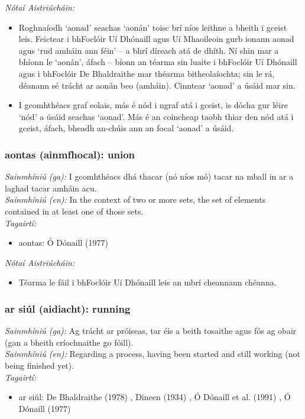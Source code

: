 \documentclass{article}
\begin{document}
 \noindent \textit{Nótaí Aistriúcháin:}
\begin{itemize}
	\item Roghnaíodh `aonad' seachas `aonán' toisc brí níos leithne a bheith i gceist leis. Feictear i bhFoclóir Uí Dhónaill agus Uí Mhaoileoin gurb ionann aonad agus `rud amháin ann féin' -- a bhrí díreach atá de dhíth. Ní shin mar a bhíonn le `aonán', áfach -- bíonn an téarma sin luaite i bhFoclóir Uí Dhónaill agus i bhFoclóir De Bhaldraithe mar théarma bitheolaíochta; sin le rá, déanann sé trácht ar aonán beo (amháin). Cinntear `aonad' a úsáid mar sin.
	\item I gcomhthéacs graf eolais, más é nód i ngraf atá i gceist, is dócha gur léire `nód' a úsáid seachas `aonad'. Más é an coincheap taobh thiar den nód atá i gceist, áfach, bheadh an-chúis ann an focal `aonad' a úsáid.
\end{itemize}


\subsubsection*{aontas (ainmfhocal): union}
 \noindent \textit{Sainmhíniú (ga):} I gcomhthéacs dhá thacar (nó níos mó) tacar na mball in ar a laghad tacar amháin acu.
\\
 \noindent \textit{Sainmhíniú (en):} In the context of two or more sets, the set of elements contained in at least one of those sets.
\\
 \noindent \textit{Tagairtí:}
\begin{itemize}
	\item aontas: Ó Dónaill (1977) \cite{odonaill}
\end{itemize}

 \noindent \textit{Nótaí Aistriúcháin:}
\begin{itemize}
	\item Téarma le fáil i bhFoclóir Uí Dhónaill leis an mbrí cheannann chéanna.
\end{itemize}


\subsubsection*{ar siúl (aidiacht): running}
 \noindent \textit{Sainmhíniú (ga):} Ag trácht ar próiseas, tar éis a beith tosaithe agus fós ag obair (gan a bheith críochnaithe go fóill).
\\
 \noindent \textit{Sainmhíniú (en):} Regarding a process, having been started and still working (not being finished yet).
\\
 \noindent \textit{Tagairtí:}
\begin{itemize}
	\item ar siúl: De Bhaldraithe (1978) \cite{de-bhaldraithe}, Dineen (1934) \cite{dineen}, Ó Dónaill et al. (1991) \cite{focloir-beag}, Ó Dónaill (1977) \cite{odonaill}
\end{itemize}
\end{document}
